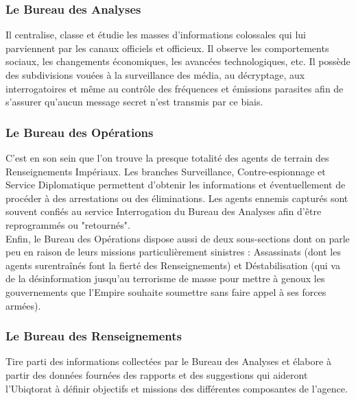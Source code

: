 \documentclass[twoside]{article}
\begin{document}
\subsubsection{Le Bureau des Analyses}
Il centralise, classe et étudie les masses d'informations colossales qui lui parviennent par les canaux officiels et officieux. Il observe les comportements sociaux, les changements économiques, les avancées technologiques, etc. Il possède des subdivisions vouées à la surveillance des média, au décryptage, aux interrogatoires et même au contrôle des fréquences et émissions parasites afin de s'assurer qu'aucun message secret n'est transmis par ce biais.

\subsubsection{Le Bureau des Opérations}
C'est en son sein que l'on trouve la presque totalité des agents de terrain des Renseignements Impériaux. Les branches Surveillance, Contre-espionnage et Service Diplomatique permettent d'obtenir les informations et éventuellement de procéder à des arrestations ou des éliminations. Les agents ennemis capturés sont souvent confiés au service Interrogation du Bureau des Analyses afin d'être reprogrammés ou "retournés".\\

Enfin, le Bureau des Opérations dispose aussi de deux sous-sections dont on parle peu en raison de leurs missions particulièrement sinistres : Assassinats (dont les agents surentra\^{i}nés font la fierté des Renseignements) et Déstabilisation (qui va de la désinformation jusqu'au terrorisme de masse pour mettre à genoux les gouvernements que l'Empire souhaite soumettre sans faire appel à ses forces armées).

\subsubsection{Le Bureau des Renseignements}
Tire parti des informations collectées par le Bureau des Analyses et élabore à partir des données fournées des rapports et des suggestions qui aideront l'Ubiqtorat à définir objectifs et missions des différentes composantes de l'agence.
\end{document}
